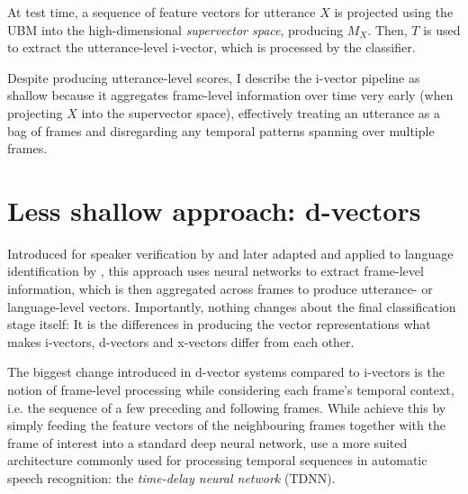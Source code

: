 \documentclass[bsc,frontabs,twoside,singlespacing,parskip,deptreport]{infthesis}
\begin{document}
{{    At test time, a sequence of feature vectors for utterance $X$ is projected using the UBM into the high-dimensional \textit{supervector space}, producing $M_X$. Then, $T$ is used to extract the utterance-level i-vector, which is processed by the classifier.

    Despite producing utterance-level scores, I describe the i-vector pipeline as shallow because it aggregates frame-level information over time very early (when projecting $X$ into the supervector space), effectively treating an utterance as a bag of frames and disregarding any temporal patterns spanning over multiple frames.
  }

  \section{Less shallow approach: d-vectors}{
    \label{sec:d-vectors}
    Introduced for speaker verification by \citet{Variani_et_al_2014} and later adapted and applied to language identification by \citet{dvectors_lid}, this approach uses neural networks to extract frame-level information, which is then aggregated across frames to produce utterance- or language-level vectors. Importantly, nothing changes about the final classification stage itself: It is the differences in producing the vector representations what makes i-vectors, d-vectors and x-vectors differ from each other.
    

    The biggest change introduced in d-vector systems compared to i-vectors is the notion of frame-level processing while considering each frame's temporal context, i.e. the sequence of a few preceding and following frames. While \citeauthor{Variani_et_al_2014} achieve this by simply feeding the feature vectors of the neighbouring frames together with the frame of interest into a standard deep neural network, \citeauthor{dvectors_lid} use a more suited architecture commonly used for processing temporal sequences in automatic speech recognition: the \textit{time-delay neural network} (TDNN).

}}
\end{document}
